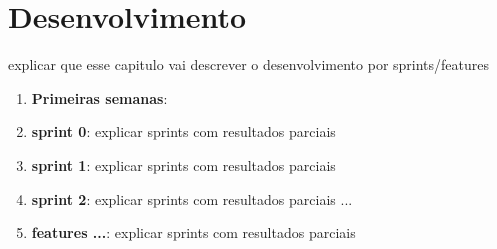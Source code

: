\newpage\null\thispagestyle{empty}\newpage
\chapter{Desenvolvimento}
\label{chap:dev}

{\color{red} explicar que esse capitulo vai descrever o desenvolvimento por 
sprints/features}


\begin{enumerate}
  \item \textbf{Primeiras semanas}: 
  \item \textbf{sprint 0}:{\color{red} explicar sprints com resultados parciais}
  \item \textbf{sprint 1}:{\color{red} explicar sprints com resultados parciais}
  \item \textbf{sprint 2}:{\color{red} explicar sprints com resultados parciais}
  {\color{red} ...}
  \item \textbf{features ...}:{\color{red} explicar sprints com resultados parciais}
\end{enumerate}

%
